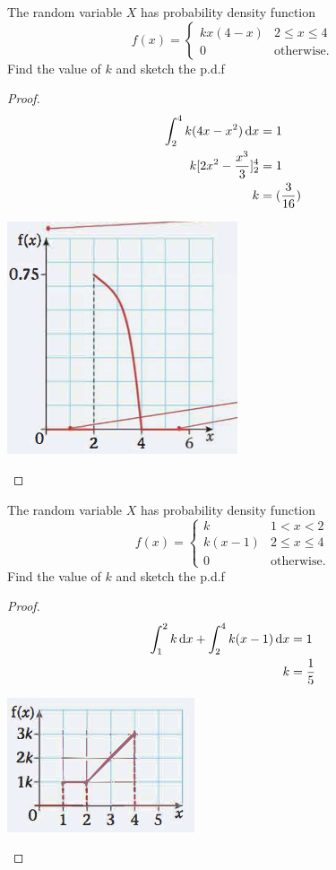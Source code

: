 \documentclass[a4paper]{article}
\begin{document}
\begin{eg}
	The random variable $X$ has probability density function
	\[
		f(x)=
		\begin{cases}
			kx(4-x) & 2\leq x \leq 4    \\
			0       & \text{otherwise.}
		\end{cases}
	\]
	Find the value of $k$ and sketch the p.d.f
	\begin{proof}
		\begin{align*}
			\int_2^4 k(4x-x^2)\, \mathrm{d} x & = 1             \\
			k[2x^2-\frac{x^3}{3}]_2^4 & =1              \\
			k                         & =(\frac{3}{16})
		\end{align*}
		\begin{center}
			\includegraphics[scale=0.5]{img_S/11_2}
		\end{center}
	\end{proof}
\end{eg}

\begin{eg}
	The random variable $X$ has probability density function
	\[
		f(x)=
		\begin{cases}
			k      & 1<x<2             \\
			k(x-1) & 2\leq x \leq 4    \\
			0      & \text{otherwise.}
		\end{cases}
	\]
	Find the value of $k$ and sketch the p.d.f
	\begin{proof}
		\begin{align*}
			\int_1^2 k\, \mathrm{d} x+\int_2^4 k(x-1)\, \mathrm{d} x & =1           \\
			k                                        & =\frac{1}{5}
		\end{align*}
		\begin{center}
			\includegraphics[scale=0.5]{img_S/11_3}
		\end{center}
	\end{proof}

\end{eg}
\end{document}

